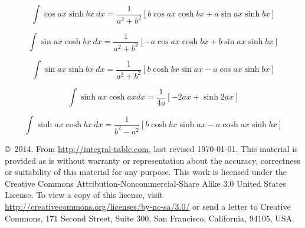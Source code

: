 \documentclass[12pt,a4paper,leqno]{article}
\begin{document}
  \begin{equation}
  \int \cos ax \sinh bx\ dx =
  \frac{1}{a^2 + b^2} \left[
  b \cos ax \cosh bx +
   a \sin ax \sinh bx
  \right]
  \end{equation}

  \begin{equation}
  \int \sin ax \cosh bx \ dx =
  \frac{1}{a^2 + b^2} \left[
  -a \cos ax \cosh bx +
   b \sin ax \sinh bx
  \right]
  \end{equation}

  \begin{equation}
  \int \sin ax \sinh bx \ dx =
  \frac{1}{a^2 + b^2} \left[
  b \cosh bx \sin ax -
   a \cos ax \sinh bx
  \right]
  \end{equation}

  \begin{equation}
  \int \sinh ax \cosh ax dx=
  \frac{1}{4a}\left[
  -2ax + \sinh 2ax \right]
  \end{equation}

  \begin{equation}
  \int \sinh ax \cosh bx \ dx =
  \frac{1}{b^2-a^2}\left[
  b \cosh bx \sinh ax
  - a \cosh ax \sinh bx \right]
  \end{equation}


  \begin{footnotesize}
    \copyright \ 2014. From  \url{http://integral-table.com}, last revised \today. This material
    is provided as is without warranty or representation about the accuracy, correctness or suitability of this material for any purpose. This work is licensed under the Creative Commons Attribution-Noncommercial-Share Alike 3.0 United States License. To view a copy of this license, visit \url{http://creativecommons.org/licenses/by-nc-sa/3.0/} or send a letter to Creative Commons, 171 Second Street, Suite 300, San Francisco, California, 94105, USA.
  \end{footnotesize}
\end{document}
